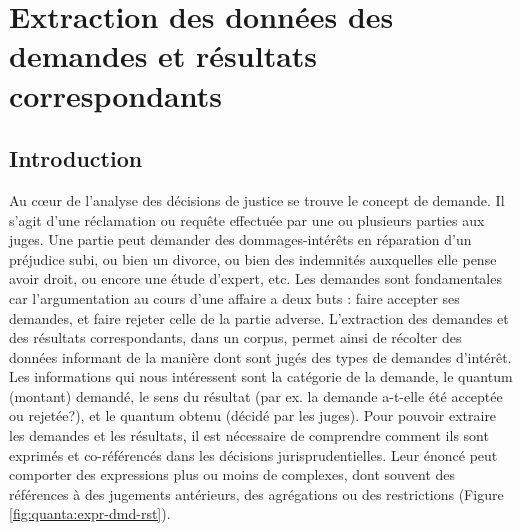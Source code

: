 \chapter{Extraction des données des demandes et résultats correspondants}
\label{chap:quanta}

\section{Introduction}
\label{sec:quanta:introduction}
Au c\oe{}ur de l'analyse des décisions de justice se trouve le concept de demande. Il s'agit d'une réclamation ou requête effectuée par une ou plusieurs parties aux juges. Une partie peut demander des dommages-intérêts en réparation d'un préjudice subi, ou bien un divorce, ou bien des indemnités auxquelles elle pense avoir droit, ou encore une étude d'expert, etc. Les demandes sont fondamentales car l'argumentation au cours d'une affaire a deux buts : faire accepter ses demandes, et faire rejeter celle de la partie adverse. L'extraction des demandes et des résultats correspondants, dans un corpus, permet ainsi de récolter des données informant de la manière dont sont jugés des types de demandes d'intérêt. Les informations qui nous intéressent sont la catégorie de la demande, le quantum (montant) demandé, le sens du résultat (par ex. la demande a-t-elle été acceptée ou rejetée?), et le quantum obtenu (décidé par les juges). Pour pouvoir extraire les demandes et les résultats, il est nécessaire de comprendre comment ils sont exprimés et co-référencés dans les décisions jurisprudentielles. Leur énoncé peut comporter des expressions plus ou moins de complexes, dont souvent des références à des jugements antérieurs, des agrégations ou des restrictions (Figure \ref{fig:quanta:expr-dmd-rst}).

